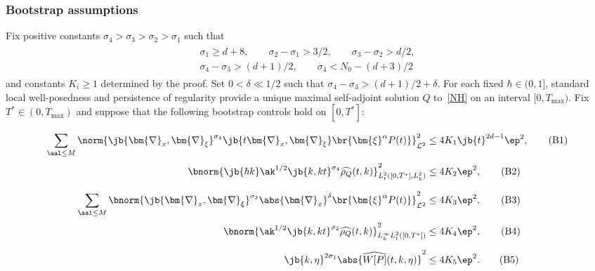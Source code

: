 \subsubsection{Bootstrap assumptions}\label{bootstrapassumptionssection}
Fix positive constants $\sigma_4>\sigma_3>\sigma_2>\sigma_1$ such that
\begin{align}\label{sigmai}
\begin{gathered}
\sigma_1\geq d+8,\qquad \sigma_2-\sigma_1>3/2,\qquad \sigma_3-\sigma_2>d/2,\\
\sigma_4-\sigma_3>(d+1)/2,\qquad \sigma_4<N_0-(d+3)/2
\end{gathered}
\end{align}and constants $K_i\geq1$ determined by the proof. Set $0<\delta\ll1/2$ such that $\sigma_4-\sigma_3>(d+1)/2+\delta$. For each fixed $\hbar\in(0,1]$, standard local well-posedness and persistence of regularity provide a unique maximal self-adjoint solution $Q$ to~\eqref{NH} on an interval $[0,T_{\max})$. Fix $T^*\in(0,T_{\max})$ and suppose that the following bootstrap controls hold on $[0,T^*]$:
\begin{align}
\sum_{\aal\leq M}\norm{\jb{\bm{\nabla}_x,\bm{\nabla}_\xi}^{\sigma_4}\jb{t\bm{\nabla}_x,\bm{\nabla}_\xi}\br{\bm{\xi}^\alpha P(t)}}_{\mathcal L^2}^2&\leq 4K_1\jb{t}^{2d-1}\ep^2,\vphantom{\int_a^b}\label{B1}\tag{B1}\\
\bnorm{\jb{\hbar k}\ak^{1/2}\jb{k,kt}^{\sigma_4}\widehat{\rho_Q}(t,k)}_{L^2_{t}([0,T^*],L^2_k)}^2&\leq 4K_2\ep^2,\vphantom{\int_a}\label{B2}\tag{B2}\\
\sum_{\aal\leq M}\bnorm{\jb{\bm{\nabla}_x,\bm{\nabla}_\xi}^{\sigma_3}\abs{\bm{\nabla}_x}^\delta \br{\bm{\xi}^\alpha P(t)}}_{\mathcal L^2}^2&\leq 4K_3\ep^2,\vphantom{\int_a^b}\tag{B3}\label{B3}\\
\bnorm{\ak^{1/2}\jb{k,kt}^{\sigma_2}\widehat{\rho_{Q}}(t,k)}_{L^\infty_kL^2_{t}([0,T^*])}^2&\leq 4K_4\ep^2,\vphantom{\int_a}\tag{B4}\label{B4}\\
\jb{k,\eta}^{2\sigma_1}\abs{\widehat{W[P]}(t,k,\eta)}^2&\leq 4K_5\ep^2.\vphantom{\int_a^b}\label{B5}\tag{B5}
\end{align}

